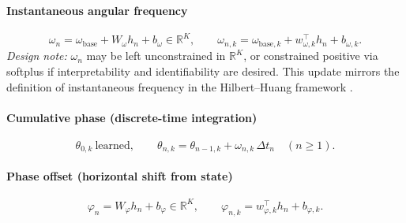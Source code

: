 \paragraph{Instantaneous angular frequency}
\begin{equation}
\omega_n = \omega_{\mathrm{base}} + W_\omega h_n + b_\omega \in \mathbb{R}^K,
\qquad
\omega_{n,k} = \omega_{\mathrm{base},k} + w_{\omega,k}^\top h_n + b_{\omega,k}.
\end{equation}
\emph{Design note:} $\omega_n$ may be left unconstrained in $\mathbb{R}^K$, or constrained positive via softplus if interpretability and identifiability are desired. This update mirrors the definition of instantaneous frequency in the Hilbert--Huang framework \citep{huang1998}.

\paragraph{Cumulative phase (discrete-time integration)}
\begin{equation}
\theta_{0,k}\ \text{learned}, \qquad
\theta_{n,k} = \theta_{n-1,k} + \omega_{n,k}\,\Delta t_n \quad (n \ge 1).
\end{equation}

\paragraph{Phase offset (horizontal shift from state)}
\begin{equation}
\varphi_n = W_\varphi h_n + b_\varphi \in \mathbb{R}^K,
\qquad
\varphi_{n,k} = w_{\varphi,k}^\top h_n + b_{\varphi,k}.
\end{equation}

